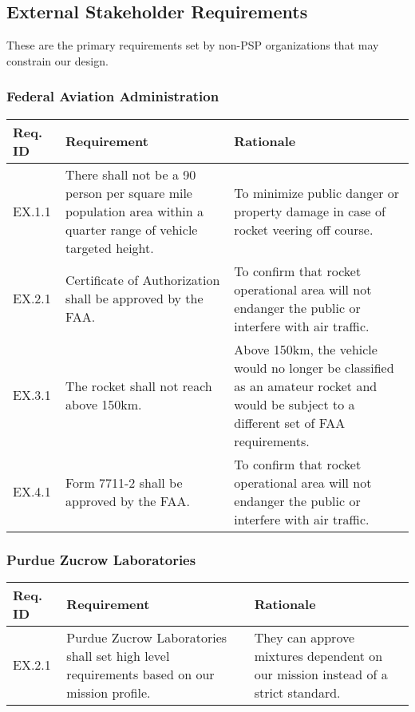 \subsection{External Stakeholder Requirements}
\noindent
These are the primary requirements set by non-PSP organizations that may constrain our design.


\subsubsection{Federal Aviation Administration}
\begin{table}[htbp]
    \footnotesize 
    \setlength{\tymin}{40pt}
    \let\raggedright\RaggedRight
    
    \begin{tabulary}{\textwidth}{@{}LLL@{}}
    \toprule
        \textbf{Req. ID} & \textbf{Requirement} & \textbf{Rationale} \\
    \midrule
        EX.1.1 & There shall not be a 90 person per square mile population area within a quarter range of vehicle targeted height. & To minimize public danger or property damage in case of rocket veering off course. \\ 
        EX.2.1 & Certificate of Authorization shall be approved by the FAA. & To confirm that rocket operational area will not endanger the public or interfere with air traffic. \\ 
        EX.3.1 & The rocket shall not reach above 150km. & Above 150km, the vehicle would no longer be classified as an amateur rocket and would be subject to a different set of FAA requirements. \\
        EX.4.1 & Form 7711-2 shall be approved by the FAA. & To confirm that rocket operational area will not endanger the public or interfere with air traffic. \\
    \bottomrule
    \end{tabulary}

    \label{table:faa-stakeholder}
\end{table}


\subsubsection{Purdue Zucrow Laboratories}
\begin{table}[htbp]
    \footnotesize 
    \setlength{\tymin}{40pt}
    \let\raggedright\RaggedRight
    
    \begin{tabulary}{\textwidth}{@{}LLL@{}}
    \toprule
        \textbf{Req. ID} & \textbf{Requirement} & \textbf{Rationale} \\
    \midrule
        EX.2.1 & Purdue Zucrow Laboratories shall set high level requirements based on our mission profile. & They can approve mixtures dependent on our mission instead of a strict standard. \\ 
    \bottomrule
    \end{tabulary}

    \label{table:pzl-stakeholder}
\end{table}


